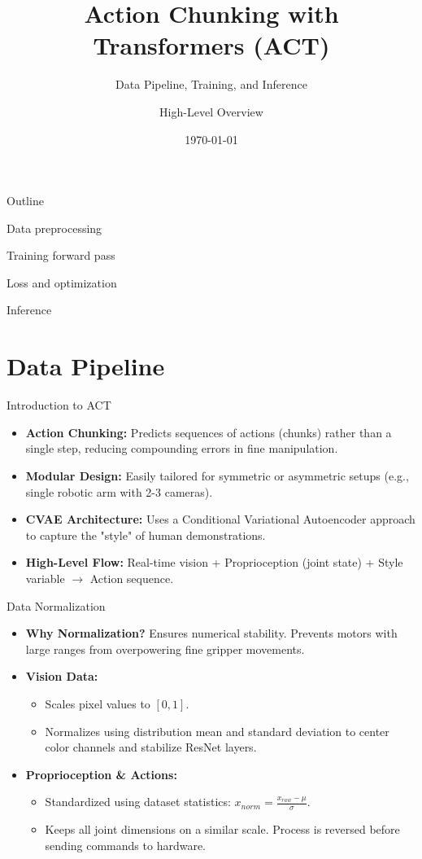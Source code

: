 \documentclass[11pt, aspectratio=169]{beamer}
\title{Action Chunking with Transformers (ACT)}
\subtitle{Data Pipeline, Training, and Inference}
\author{High-Level Overview}
\date{\today}
\begin{document}
\begin{frame}
    \titlepage
\end{frame}

\begin{frame}{Outline}
    \item Data preprocessing
    \item Training forward pass
    \item Loss and optimization
    \item Inference
\end{frame}

\section{Data Pipeline}

\begin{frame}{Introduction to ACT}
    \begin{itemize}
        \item \textbf{Action Chunking:} Predicts sequences of actions (chunks) rather than a single step, reducing compounding errors in fine manipulation.
        \item \textbf{Modular Design:} Easily tailored for symmetric or asymmetric setups (e.g., single robotic arm with 2-3 cameras).
        \item \textbf{CVAE Architecture:} Uses a Conditional Variational Autoencoder approach to capture the "style" of human demonstrations.
        \item \textbf{High-Level Flow:} Real-time vision + Proprioception (joint state) + Style variable $\rightarrow$ Action sequence.
    \end{itemize}
\end{frame}

\begin{frame}{Data Normalization}
    \begin{itemize}
        \item \textbf{Why Normalization?} Ensures numerical stability. Prevents motors with large ranges from overpowering fine gripper movements.
        \item \textbf{Vision Data:} 
        \begin{itemize}
            \item Scales pixel values to $[0, 1]$.
            \item Normalizes using distribution mean and standard deviation to center color channels and stabilize ResNet layers.
        \end{itemize}
        \item \textbf{Proprioception \& Actions:}
        \begin{itemize}
            \item Standardized using dataset statistics: $x_{norm} = \frac{x_{raw} - \mu}{\sigma}$.
            \item Keeps all joint dimensions on a similar scale. Process is reversed before sending commands to hardware.
        \end{itemize}
    \end{itemize}
\end{frame}
\end{document}
